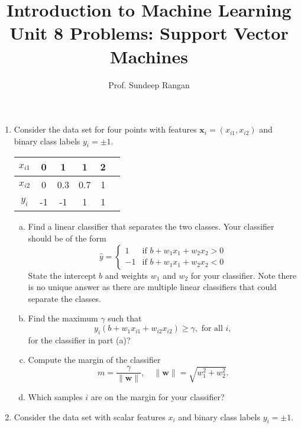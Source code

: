 \documentclass[11pt]{article}
\newcommand{\wbf}{\mathbf{w}}
\newcommand{\xbf}{\mathbf{x}}
\begin{document}
\title{Introduction to Machine Learning\\
Unit 8 Problems:  Support Vector Machines}
\author{Prof. Sundeep Rangan}
\date{}

\maketitle

\begin{enumerate}

\item Consider the data set for four points with
features $\xbf_i=(x_{i1},x_{i2})$ and binary class
labels $y_i=\pm 1$.

\begin{center}
\begin{tabular}{|c|c|c|c|c|c|} \hline
$x_{i1}$ & 0 & 1 & 1 & 2 \\ \hline
$x_{i2}$ & 0 & 0.3 & 0.7 & 1 \\ \hline
$y_i$ & -1 & -1 & 1 & 1 \\ \hline
\end{tabular}
\end{center}

\begin{enumerate}[(a)]
\item Find a linear classifier that separates the two classes.
Your classifier should be of the form
\[
    \hat{y} = \begin{cases}
        1 & \mbox{if } b + w_1 x_1 + w_2 x_2 > 0 \\
        -1 & \mbox{if } b + w_1 x_1 + w_2 x_2 < 0
    \end{cases}
\]
State the intercept $b$ and weights $w_1$ and $w_2$ for your classifier.
Note there is no unique answer as there are multiple linear classifiers
that could separate the classes.

\item Find the maximum $\gamma$ such that
\[
    y_i(b+w_1x_{i1} + w_{i2}x_{i2}) \geq \gamma, \mbox{ for all } i,
\]
for the classifier in part (a)?

\item Compute the margin of the classifier
\[
    m = \frac{\gamma}{\|\wbf\|}, \quad \|\wbf\|= \sqrt{ w_1^2 + w_2^2 }.
\]

\item Which samples $i$ are on the margin for your classifier?
\end{enumerate}

\item  Consider the data set with scalar features $x_i$
and binary class labels $y_i=\pm 1$.


\end{enumerate}
\end{document}
